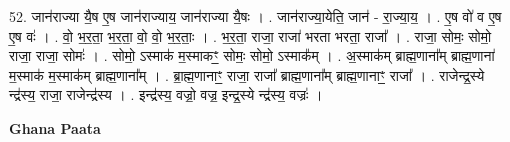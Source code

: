 \documentclass[17pt]{extarticle}
\begin{document}
52. जान॑राज्या यै॒ष ए॒ष जान॑राज्याय॒ जान॑राज्या यै॒षः । . जान॑राज्या॒येति॒ जान॑ - रा॒ज्या॒य॒ । . ए॒ष वो॑ व ए॒ष ए॒ष वः॑ । . वो॒ भ॒र॒ता॒ भ॒र॒ता॒ वो॒ वो॒ भ॒र॒ताः॒ । . भ॒र॒ता॒ राजा॒ राजा॑ भरता भरता॒ राजा᳚ । . राजा॒ सोमः॒ सोमो॒ राजा॒ राजा॒ सोमः॑ । . सोमो॒ ऽस्माक॑ म॒स्माकꣳ॒॒ सोमः॒ सोमो॒ ऽस्माक᳚म् । . अ॒स्माक॑म् ब्राह्म॒णाना᳚म् ब्राह्म॒णाना॑ म॒स्माक॑ म॒स्माक॑म् ब्राह्म॒णाना᳚म् । . ब्रा॒ह्म॒णानाꣳ॒॒ राजा॒ राजा᳚ ब्राह्म॒णाना᳚म् ब्राह्म॒णानाꣳ॒॒ राजा᳚ । . राजेन्द्र॒स्ये न्द्र॑स्य॒ राजा॒ राजेन्द्र॑स्य । . इन्द्र॑स्य॒ वज्रो॒ वज्र॒ इन्द्र॒स्ये न्द्र॑स्य॒ वज्रः॑ । \newline

\textbf{Ghana Paata } \newline
\end{document}
